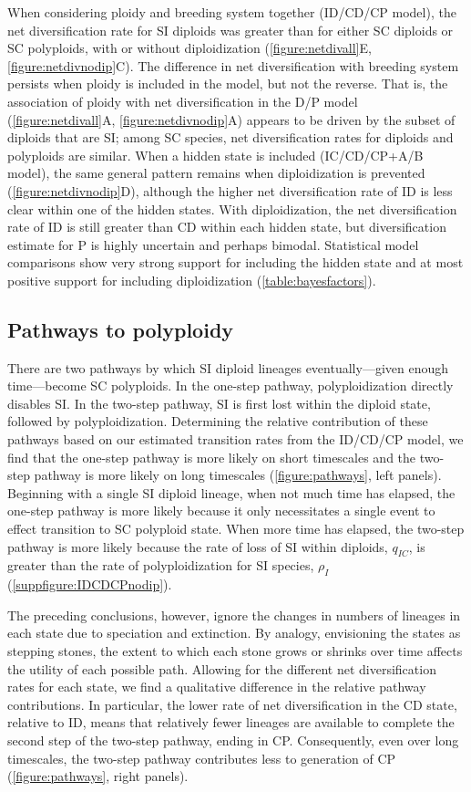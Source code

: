 When considering ploidy and breeding system together (ID/CD/CP model), the net diversification rate for SI diploids was greater than for either SC diploids or SC polyploids, with or without diploidization (\cref{figure:netdivall}E, \cref{figure:netdivnodip}C).
The difference in net diversification with breeding system persists when ploidy is included in the model, but not the reverse.
That is, the association of ploidy with net diversification in the D/P model (\cref{figure:netdivall}A, \cref{figure:netdivnodip}A) appears to be driven by the subset of diploids that are SI; among SC species, net diversification rates for diploids and polyploids are similar.
%
When a hidden state is included (IC/CD/CP+A/B model), the same general pattern remains when diploidization is prevented (\cref{figure:netdivnodip}D), although the higher net diversification rate of ID is less clear within one of the hidden states.
With diploidization, the net diversification rate of ID is still greater than CD within each hidden state, but diversification estimate for P is highly uncertain and perhaps bimodal.
Statistical model comparisons show very strong support for including the hidden state and at most positive support for including diploidization (\cref{table:bayesfactors}).

\subsection{Pathways to polyploidy}

There are two pathways by which SI diploid lineages eventually---given enough time---become SC polyploids.
In the one-step pathway, polyploidization directly disables SI.
In the two-step pathway, SI is first lost within the diploid state, followed by polyploidization.
Determining the relative contribution of these pathways based on our estimated transition rates from the ID/CD/CP model, we find that the one-step pathway is more likely on short timescales and the two-step pathway is more likely on long timescales (\cref{figure:pathways}, left panels).
Beginning with a single SI diploid lineage, when not much time has elapsed, the one-step pathway is more likely because it only necessitates a single event to effect transition to SC polyploid state.
When more time has elapsed, the two-step pathway is more likely because the rate of loss of SI within diploids, $q_{IC}$, is greater than the rate of polyploidization for SI species, $\rho_I$ (\cref{suppfigure:IDCDCPnodip}).

The preceding conclusions, however, ignore the changes in numbers of lineages in each state due to speciation and extinction.
By analogy, envisioning the states as stepping stones, the extent to which each stone grows or shrinks over time affects the utility of each possible path.
Allowing for the different net diversification rates for each state, we find a qualitative difference in the relative pathway contributions.
In particular, the lower rate of net diversification in the CD state, relative to ID, means that relatively fewer lineages are available to complete the second step of the two-step pathway, ending in CP.
Consequently, even over long timescales, the two-step pathway contributes less to generation of CP (\cref{figure:pathways}, right panels).


